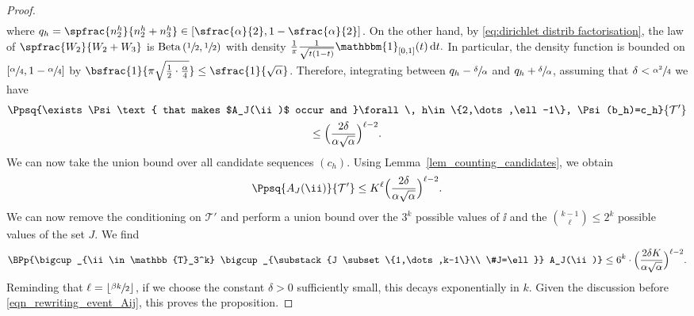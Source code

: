 \begin{proof}
\begin{multline*}
\end{multline*}
where $q_h=\spfrac{n^{h}_2}{n^{h}_2+n^{h}_3} \in \left[ \sfrac{\alpha}{2}, 1-\sfrac{\alpha}{2} \right]$.
On the other hand, by \eqref{eq:dirichlet distrib factorisation}, the law of $\spfrac{W_2}{W_2+W_3}$ is $\mathrm{Beta}\left(\sfrac{1}{2},\sfrac{1}{2}\right)$
with density
\(\frac{1}{\pi} \frac{1}{\sqrt{t(1-t)}} \mathbbm{1}_{[0,1]}(t) \, \mathrm{d}t.\)
In particular, the density function is bounded on $\left[ \sfrac{\alpha}{4}, 1-\sfrac{\alpha}{4} \right]$ by $\bsfrac{1}{\pi \sqrt{ \frac{1}{2} \cdot \frac{\alpha}{4}}}\leq \sfrac{1}{\sqrt{\alpha}}$.
Therefore, integrating between $q_h-\sfrac{\delta}{\alpha}$ and $q_h+\sfrac{\delta}{\alpha}$, assuming that $\delta<\sfrac{\alpha^2}{4}$ we have
\begin{multline*}
\Ppsq{\exists \Psi \text{ that makes $A_J(\ii)$ occur and }\forall \, h\in\{2,\dots,\ell-1\}, \Psi(b_h)=c_h}{ \mathcal{T'}} \\ \leq \Bigl( \frac{2\delta}{\alpha\sqrt{\alpha}} \Bigr)^{\ell-2}.
\end{multline*}
We can now take the union bound over all candidate sequences $(c_h)$. Using Lemma~\ref{lem_counting_candidates}, we obtain
\[ \Ppsq{A_J(\ii)}{ \mathcal{T'}} \leq K^{\ell} \Bigl( \frac{2\delta}{\alpha\sqrt{\alpha}} \Bigr)^{\ell-2}.\]
We can now remove the conditioning on $\mathcal{T'}$ and perform a union bound over the $3^k$ possible values of $\ii$ and the $\binom{k-1}{\ell} \leq 2^k$ possible values of the set $J$.
We find
\begin{equation}\label{eq:how small delta has to be}
\BPp{\bigcup_{\ii\in \mathbb{T}_3^k} \bigcup_{\substack{J \subset \{1,\dots,k-1\}\\ \#J=\ell}} A_J(\ii)} \leq 6 ^k \cdot \Bigl( \frac{2\delta K}{\alpha\sqrt{\alpha}} \Bigr)^{\ell-2}.
\end{equation}
Reminding that $\ell=\lfloor\sfrac{\beta k}{2}\rfloor$, if we choose the constant $\delta>0$ sufficiently small, this decays exponentially in $k$.
Given the discussion before \eqref{eqn_rewriting_event_Aij}, this proves the proposition.
\end{proof}

